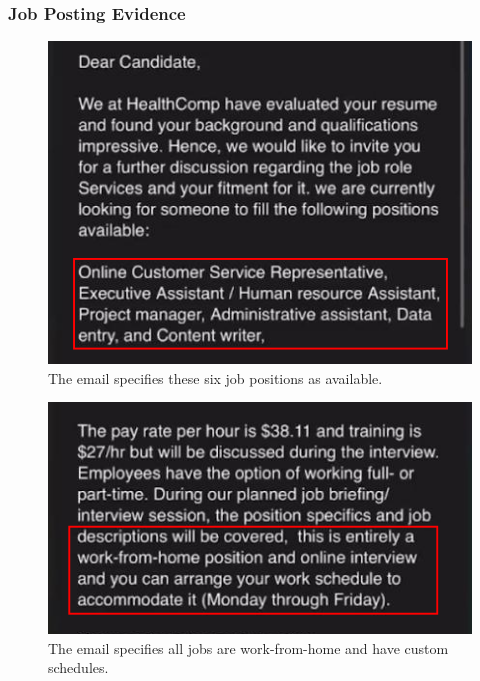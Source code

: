 \begin{fullwidth}
\subsubsection{Job Posting Evidence}

\begin{figure}[H] %
    \label{sec:Fig6}
    \centering
    \includegraphics[width=.75\linewidth]{assets/positions.png}
    \captionsetup{justification=centering}
    \caption{The email specifies these six job positions as available.}
\end{figure}

\begin{figure}[H] %
    \label{sec:Fig7}
    \centering
    \includegraphics[width=.75\linewidth]{assets/remoteSched.png}
    \captionsetup{justification=centering}
    \caption{The email specifies all jobs are work-from-home and have custom schedules.}
\end{figure}


\end{fullwidth}
